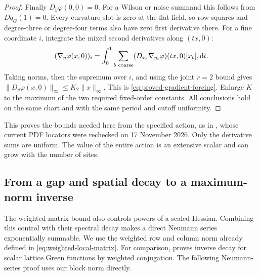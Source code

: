 \documentclass[11pt,reqno]{amsart}
\numberwithin{equation}{section}
\theoremstyle{definition}
\theoremstyle{remark}
\newcommand{\dd}{\mathrm d}
\begin{document}
\begin{proof}
Finally \(D_y\varphi(0,0)=0\). For a Wilson or noise
summand this follows from \(Dq_G(1)=0\). Every curvature
slot is zero at the flat field, so row squares and
degree-three or degree-four terms also have zero first
derivative there. For a fine coordinate \(i\), integrate
the mixed second derivatives along \((tx,0)\):
\[
 (\nabla_y\varphi(x,0))_i
     =\int_0^1\sum_{b\ {\rm coarse}}
             (D_{x_b}\nabla_{y_i}\varphi)(tx,0)[x_b],\dd t.
\]
Taking norms, then the supremum over \(i\), and using
the joint \(r=2\) bound gives
\(\|D_y\varphi(x,0)\|_\infty\le K_2\|x\|_\infty\).
This is \eqref{eq:proved-gradient-forcing}. Enlarge
\(K\) to the maximum of the two required fixed-order
constants. All conclusions hold on the same chart and
with the same period and cutoff uniformity.
\end{proof}

This proves the bounds needed here from the specified action,
as in \cite[Lemma~14.13, pp.~67--68]{Main}, whose current
PDF locators were rechecked on 17 November 2026.
Only the derivative sums are uniform. The value of the entire
action is an extensive scalar and can grow with the number
of sites.

\subsection{From a gap and spatial decay to a maximum-norm inverse}

The weighted matrix bound also controls powers of a scaled
Hessian. Combining this control with their spectral decay
makes a direct Neumann series exponentially summable.
We use the weighted row and column norm already defined in
\eqref{eq:weighted-local-matrix}. For comparison,
\cite[Section~2.4, Lemma~2.12, p.~14]{DST23} proves inverse
decay for scalar lattice Green functions by weighted conjugation.
The following Neumann-series proof uses our block norm directly.
\end{document}
